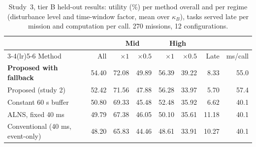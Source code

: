 \begin{table}[t]
\caption{Study~3, tier B held-out results: utility (\%) per method overall and per regime (disturbance level and time-window factor, mean over $\kappa_B$), tasks served late per mission and computation per call. 270 missions, 12 configurations.}\label{tab:s3}
\centering\small
\begin{tabular}{lrrrrrrr}
\toprule
& & \multicolumn{2}{c}{Mid} & \multicolumn{2}{c}{High} & & \\
\cmidrule(lr){3-4}\cmidrule(lr){5-6}
Method & All & $\times 1$ & $\times 0.5$ & $\times 1$ & $\times 0.5$ & Late & ms/call \\
\midrule
\textbf{Proposed with fallback} & 54.40 & 72.08 & 49.89 & 56.39 & 39.22 & 8.33 & 55.0 \\
Proposed (study 2) & 52.42 & 71.56 & 47.88 & 56.28 & 33.97 & 5.70 & 57.4 \\
Constant 60 s buffer & 50.80 & 69.33 & 45.48 & 52.48 & 35.92 & 6.62 & 40.1 \\
ALNS, fixed 40 ms & 49.79 & 67.38 & 46.05 & 50.10 & 35.61 & 11.18 & 40.1 \\
Conventional (40 ms, event-only) & 48.20 & 65.83 & 44.46 & 48.61 & 33.91 & 10.27 & 40.1 \\
\bottomrule
\end{tabular}
\end{table}
